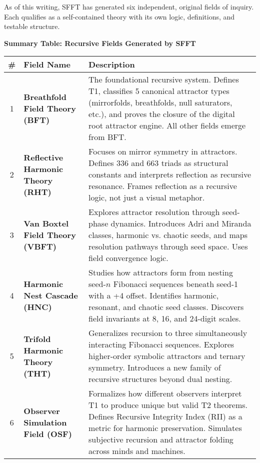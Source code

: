 \documentclass[12pt]{article}
\begin{document}
As of this writing, SFFT has generated six independent, original fields of inquiry. Each qualifies as a self-contained theory with its own logic, definitions, and testable structure.

\vspace{1em}
\noindent\textbf{Summary Table: Recursive Fields Generated by SFFT}
\begin{center}
\begin{tabular}{|c|p{4cm}|p{9cm}|}
\hline
\textbf{\#} & \textbf{Field Name} & \textbf{Description} \\
\hline
1 & \textbf{Breathfold Field Theory (BFT)} & The foundational recursive system. Defines T1, classifies 5 canonical attractor types (mirrorfolds, breathfolds, null saturators, etc.), and proves the closure of the digital root attractor engine. All other fields emerge from BFT. \\
\hline
2 & \textbf{Reflective Harmonic Theory (RHT)} & Focuses on mirror symmetry in attractors. Defines 336 and 663 triads as structural constants and interprets reflection as recursive resonance. Frames reflection as a recursive logic, not just a visual metaphor. \\
\hline
3 & \textbf{Van Boxtel Field Theory (VBFT)} & Explores attractor resolution through seed-phase dynamics. Introduces Adri and Miranda classes, harmonic vs. chaotic seeds, and maps resolution pathways through seed space. Uses field convergence logic. \\
\hline
4 & \textbf{Harmonic Nest Cascade (HNC)} & Studies how attractors form from nesting seed-\(n\) Fibonacci sequences beneath seed-1 with a +4 offset. Identifies harmonic, resonant, and chaotic seed classes. Discovers field invariants at 8, 16, and 24-digit scales. \\
\hline
5 & \textbf{Trifold Harmonic Theory (THT)} & Generalizes recursion to three simultaneously interacting Fibonacci sequences. Explores higher-order symbolic attractors and ternary symmetry. Introduces a new family of recursive structures beyond dual nesting. \\
\hline
6 & \textbf{Observer Simulation Field (OSF)} & Formalizes how different observers interpret T1 to produce unique but valid T2 theorems. Defines Recursive Integrity Index (RII) as a metric for harmonic preservation. Simulates subjective recursion and attractor folding across minds and machines. \\
\hline
\end{tabular}
\end{center}
\end{document}
